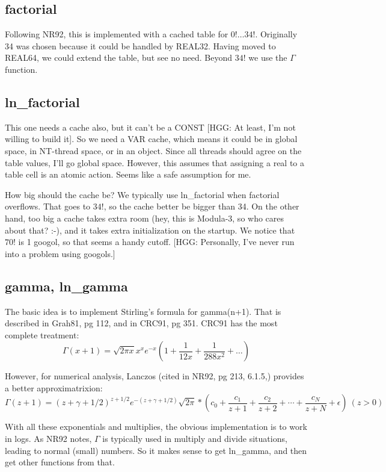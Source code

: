 \subsection*{factorial}
Following NR92, this is implemented with a cached table for
$0! \dots 34!$.
Originally 34 was chosen because it could be handled by
REAL32.  Having moved to REAL64, we could extend the
table, but see no need.  Beyond $34!$ we use the $\Gamma$ function.

\subsection*{ln\_factorial}
This one needs a cache also, but it can't be a
CONST [HGG: At least, I'm not willing to build it].  So we need a VAR
cache, which means it could be in global space, in NT-thread
space, or in an object.  Since all threads should agree on
the table values, I'll go global space.  However, this
assumes that assigning a real to a table cell is an atomic
action.  Seems like a safe assumption for me.

How big should the cache be?  We typically use ln\_factorial when
factorial overflows.  That goes to $34!$, so the cache better be bigger
than 34.  On the
other hand, too big a cache takes extra room (hey, this is
Modula-3, so who cares about that? :-), and it takes extra
initialization on the startup.  We notice that $70!$ is 1
googol, so that seems a handy cutoff.  [HGG: Personally, I've
never run into a problem using googols.]


\subsection*{gamma, ln\_gamma}
The basic idea is to implement Stirling's formula for gamma(n+1).
That is described in Grah81, pg 112, and in
CRC91, pg 351.  CRC91 has the most complete treatment:
\begin{equation}
  \Gamma(x+1)=\sqrt{2\pi x}x^{x}e^{-x}(1+\frac{1}{12x}
    +\frac{1}{288x^2}+\dots)
\end{equation}

However, for numerical analysis, Lanczos (cited in NR92, pg 213, 6.1.5,)
provides a better approximatrixion:
\begin{equation}
  \Gamma(z+1)=(z+ \gamma +1/2)^{z+1/2}e^{-(z+ \gamma +1/2)}
  \sqrt{2\pi}*(c_0+\frac{c_1}{z+1}+\frac{c_2}{z+2}
       +\cdots+\frac{c_N}{z+N}+\epsilon)\ (z>0)
\end{equation}

With all these exponentials and multiplies, the obvious implementation
is to work in logs.  As NR92 notes, $\Gamma$ is typically used
in multiply and divide situations, leading to normal (small) numbers.
So it makes sense to get ln\_gamma, and then get other functions from that.

